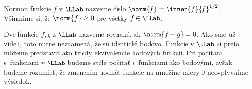 %
\begin{definicia}
    Normou funkcie $f$ v $\LLab$ nazveme číslo
    $\norm{f} = \inner{f}{f}^{1/2}$.
    Všimnime si, že $\norm{f}\ge0$ pre všetky $f\in \LLab$.
\end{definicia}

\begin{definicia}
    Dve funkcie $f,g$ z $\LLab$ nazveme rovnaké, ak
    $\norm{f-g}=0$. Ako sme už videli, toto nutne neznamená, že sú
    identické bodovo. Funkcie v $\LLab$ si preto môžeme predstaviť ako
    triedy ekvivalencie bodových funkcii. Pri počítaní s~funkciami 
    v $\LLab$ budeme stále počítať s~funkciami ako bodovými, avšak budeme
    rozumieť, že zmenením hodnôt funkcie na množine miery 0
    neovplyvníme výsledok.
\end{definicia}



